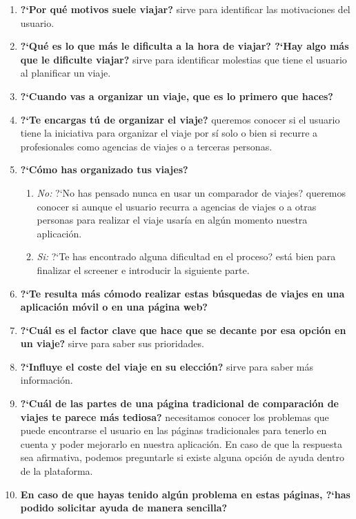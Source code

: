 \begin{enumerate}
    \item {\textbf{?`Por qué motivos suele viajar?}} sirve para identificar las motivaciones del usuario.
    \item {\textbf{?`Qué es lo que más le dificulta a la hora de viajar? ?`Hay algo más que le dificulte viajar?}} sirve para identificar molestias que tiene
                el usuario al planificar un viaje.
    \item {\textbf{?`Cuando vas a organizar un viaje, que es lo primero que haces?}}
    \item {\textbf{?`Te encargas tú de organizar el viaje?}} queremos conocer si el usuario tiene la iniciativa para organizar el viaje por sí solo o bien si
                recurre a profesionales como agencias de viajes o a terceras personas.
    \item{ \textbf{?`Cómo has organizado tus viajes?}}
    \begin{enumerate}
        \item {\textit{No:}} ?`No has pensado nunca en usar un comparador de viajes? queremos conocer si aunque el usuario recurra a agencias de viajes o
                        a otras personas para realizar el viaje usaría en algún momento nuestra aplicación.
        \item {\textit{Si:}} ?`Te has encontrado alguna dificultad en el proceso? está bien para finalizar el screener e introducir la siguiente parte.
    \end{enumerate}
    \item {\textbf{?`Te resulta más cómodo realizar estas búsquedas de viajes en una aplicación móvil o en una página web?}}
    \item {\textbf{?`Cuál es el factor clave que hace que se decante por esa opción en un viaje?}} sirve para saber sus prioridades.
    \item {\textbf{?`Influye el coste del viaje en su elección?}} sirve para saber más información.
    \item {\textbf{?`Cuál de las partes de una página tradicional de comparación de viajes te parece más tediosa?}} necesitamos conocer los problemas que
                puede encontrarse el usuario en las páginas tradicionales para tenerlo en cuenta y poder mejorarlo en nuestra aplicación. En caso de que
                la respuesta sea afirmativa, podemos preguntarle si existe alguna opción de ayuda dentro de la plataforma.
    \item {\textbf{En caso de que hayas tenido algún problema en estas páginas, ?`has podido solicitar ayuda de manera sencilla?}}

\end{enumerate}
